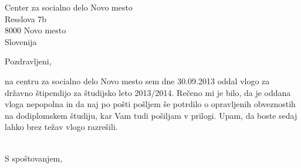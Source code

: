 \documentclass[a4paper]{scrlttr2}
\begin{document}
 
\begin{letter}{Center za socialno delo Novo mesto \\ Resslova 7b \\ 8000 Novo mesto \\ Slovenija}
 

\opening{Pozdravljeni,}
 
na centru za socialno delo Novo mesto sem dne 30.09.2013 oddal vlogo za državno štipendijo za študijsko leto 2013/2014. Rečeno mi je bilo, da je oddana vloga nepopolna in da naj po pošti pošljem še potrdilo o opravljenih obveznostih na dodiplomskem študiju, kar Vam tudi pošiljam v prilogi. Upam, da boste sedaj lahko brez težav vlogo razrešili.
\\
\\
\closing{S spoštovanjem,}

 
\end{letter}
 
\end{document}
